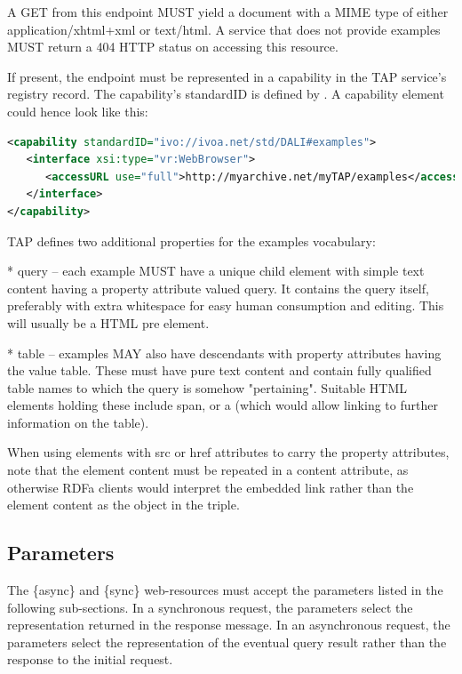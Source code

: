 \documentclass[11pt,letter]{ivoa}
\begin{document}
A GET from this endpoint MUST yield a document with a MIME type of either 
application/xhtml+xml or text/html. A service that does not provide examples 
MUST return a 404 HTTP status on accessing this resource.

If present, the endpoint must be represented in a capability in the TAP 
service's registry record. The capability's standardID is defined by 
\citep{std:DALI}. A capability element could hence look like this:

\begin{lstlisting}[language=XML]
<capability standardID="ivo://ivoa.net/std/DALI#examples">
   <interface xsi:type="vr:WebBrowser">
      <accessURL use="full">http://myarchive.net/myTAP/examples</accessURL>
   </interface>
</capability>
\end{lstlisting}

TAP defines two additional properties for the examples vocabulary:

* query -- each example MUST have a unique child element with simple text 
content having a property attribute valued query. It contains the query itself, 
preferably with extra whitespace for easy human consumption and editing. This 
will usually be a HTML pre element.
    
* table -- examples MAY also have descendants with property attributes having 
the value table. These must have pure text content and contain fully qualified 
table names to which the query is somehow "pertaining". Suitable HTML elements 
holding these include span, or a (which would allow linking to further 
information on the table).

When using elements with src or href attributes to carry the property 
attributes, note that the element content must be repeated in a content 
attribute, as otherwise RDFa clients would interpret the embedded link rather 
than the element content as the object in the triple.

\subsection{Parameters}
\label{sec:parameters}

The \{async\} and \{sync\} web-resources must accept the parameters listed in 
the following sub-sections. In a synchronous request, the parameters select the 
representation returned in the response message. In an asynchronous request, the 
parameters select the representation of the eventual query result rather than 
the response to the initial request.
\end{document}
